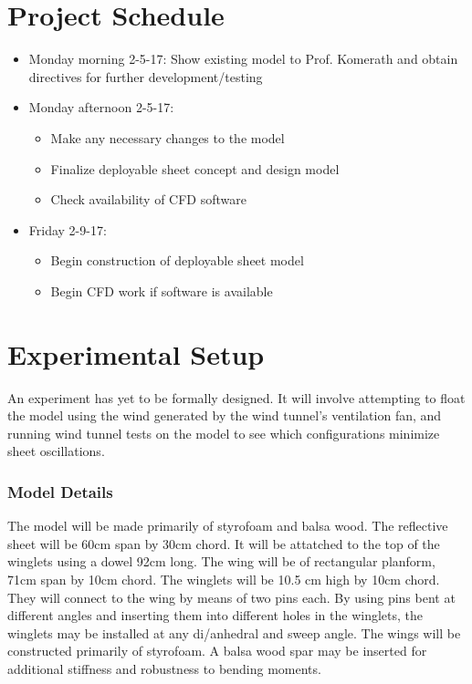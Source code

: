 \documentclass[12pt]{report} %
\begin{document}
\chapter{Project Schedule}
\begin{itemize}
  \item Monday morning 2-5-17:  Show existing model to Prof. Komerath and obtain directives for further development/testing
  \item Monday afternoon 2-5-17:
  \begin{itemize}
    \item Make any necessary changes to the model
    \item Finalize deployable sheet concept and design model
    \item Check availability of CFD software
  \end{itemize}
  \item Friday 2-9-17:
  \begin{itemize}
    \item Begin construction of deployable sheet model
    \item Begin CFD work if software is available
  \end{itemize}
\end{itemize}

\chapter{Experimental Setup}
An experiment has yet to be formally designed.  It will involve attempting to float the model using the wind generated by the wind tunnel's
ventilation fan, and running wind tunnel tests on the model to see which configurations minimize sheet oscillations.

\subsection{Model Details}

The model will be made primarily of styrofoam and balsa wood.  The reflective sheet will be 60cm span by 30cm chord.  It will be attatched
to the top of the winglets using a dowel 92cm long.  The wing will be of rectangular planform, 71cm span by 10cm chord.  The winglets will
be 10.5 cm high by 10cm chord.  They will connect to the wing by means of two pins each.  By using pins bent at different angles and
inserting them into different holes in the winglets, the winglets may be installed at any di/anhedral and sweep angle.
The wings will be constructed primarily of styrofoam.  A balsa wood spar may be inserted for additional stiffness and robustness to bending
moments.
\end{document}
